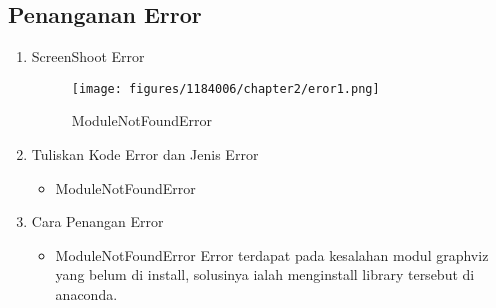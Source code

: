 \newpage\subsection{Penanganan Error}
\begin{enumerate}
	\item ScreenShoot Error
	\begin{figure}[h]
		\texttt{[image: figures/1184006/chapter2/eror1.png]}
		\centering
		\caption{ModuleNotFoundError}
	\end{figure}
	\item Tuliskan Kode Error dan Jenis Error
	\begin{itemize}
	
		\item ModuleNotFoundError
	\end{itemize}
	\item Cara Penangan Error
	\begin{itemize}
		\item ModuleNotFoundError
		\hfill\break
		Error terdapat pada kesalahan modul graphviz yang belum di install, solusinya ialah menginstall library tersebut di anaconda.
	\end{itemize}
\end{enumerate}
